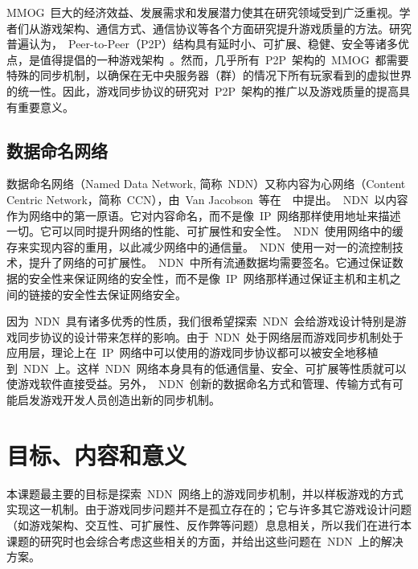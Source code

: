 MMOG~巨大的经济效益、发展需求和发展潜力使其在研究领域受到广泛重视。学者们从游戏架构、通信方式、通信协议等各个方面研究提升游戏质量的方法。研究普遍认为，~Peer-to-Peer（P2P）结构具有延时小、可扩展、稳健、安全等诸多优点，是值得提倡的一种游戏架构~\cite{chandy, mimaze, cr, bryant, Ferretti2005}。然而，几乎所有~P2P~架构的~MMOG~都需要特殊的同步机制，以确保在无中央服务器（群）的情况下所有玩家看到的虚拟世界的统一性。因此，游戏同步协议的研究对~P2P~架构的推广以及游戏质量的提高具有重要意义。



\subsection{数据命名网络}

数据命名网络（Named Data Network, 简称~NDN）又称内容为心网络（Content Centric Network，简称~CCN），由~Van Jacobson~等在~\cite{Jndn}~中提出。~NDN~以内容作为网络中的第一原语。它对内容命名，而不是像~IP~网络那样使用地址来描述一切。它可以同时提升网络的性能、可扩展性和安全性。~NDN~使用网络中的缓存来实现内容的重用，以此减少网络中的通信量。~NDN~使用一对一的流控制技术，提升了网络的可扩展性。~NDN~中所有流通数据均需要签名。它通过保证数据的安全性来保证网络的安全性，而不是像~IP~网络那样通过保证主机和主机之间的链接的安全性去保证网络安全。

因为~NDN~具有诸多优秀的性质，我们很希望探索~NDN~会给游戏设计特别是游戏同步协议的设计带来怎样的影响。由于~NDN~处于网络层而游戏同步机制处于应用层，理论上在~IP~网络中可以使用的游戏同步协议都可以被安全地移植到~NDN~上。这样~NDN~网络本身具有的低通信量、安全、可扩展等性质就可以使游戏软件直接受益。另外，~NDN~创新的数据命名方式和管理、传输方式有可能启发游戏开发人员创造出新的同步机制。

\section{目标、内容和意义}
\label{goals}

本课题最主要的目标是探索~NDN~网络上的游戏同步机制，并以样板游戏的方式实现这一机制。由于游戏同步问题并不是孤立存在的；它与许多其它游戏设计问题（如游戏架构、交互性、可扩展性、反作弊等问题）息息相关，所以我们在进行本课题的研究时也会综合考虑这些相关的方面，并给出这些问题在~NDN~上的解决方案。

